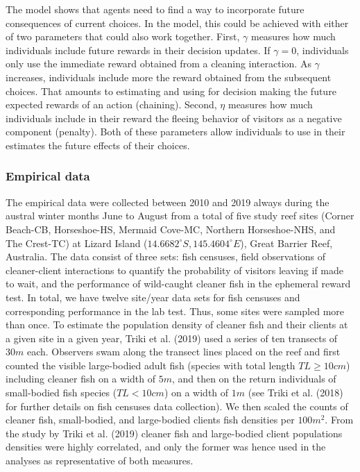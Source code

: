 \documentclass[
  12pt,
]{article}
\begin{document}
The model shows that agents need to find a way to incorporate future
consequences of current choices. In the model, this could be achieved
with either of two parameters that could also work together. First,
\(\gamma\) measures how much individuals include future rewards in their
decision updates. If \(\gamma=0\), individuals only use the immediate
reward obtained from a cleaning interaction. As \(\gamma\) increases,
individuals include more the reward obtained from the subsequent
choices. That amounts to estimating and using for decision making the
future expected rewards of an action (chaining). Second, \(\eta\)
measures how much individuals include in their reward the fleeing
behavior of visitors as a negative component (penalty). Both of these
parameters allow individuals to use in their estimates the future
effects of their choices.

\hypertarget{empirical-data}{%
\subsubsection{Empirical data}\label{empirical-data}}

The empirical data were collected between 2010 and 2019 always during
the austral winter months June to August from a total of five study reef
sites (Corner Beach-CB, Horseshoe-HS, Mermaid Cove-MC, Northern
Horseshoe-NHS, and The Crest-TC) at Lizard Island
(\(14.6682^\circ S, 145.4604^\circ E\)), Great Barrier Reef, Australia.
The data consist of three sets: fish censuses, field observations of
cleaner-client interactions to quantify the probability of visitors
leaving if made to wait, and the performance of wild-caught cleaner fish
in the ephemeral reward test. In total, we have twelve site/year data
sets for fish censuses and corresponding performance in the lab test.
Thus, some sites were sampled more than once. To estimate the population
density of cleaner fish and their clients at a given site in a given
year, Triki et al. (2019) used a series of ten transects of \(30m\)
each. Observers swam along the transect lines placed on the reef and
first counted the visible large-bodied adult fish (species with total
length \(TL \geq 10cm\)) including cleaner fish on a width of \(5m\),
and then on the return individuals of small-bodied fish species
(\(TL < 10 cm\)) on a width of \(1 m\) (see Triki et al. (2018) for
further details on fish censuses data collection). We then scaled the
counts of cleaner fish, small-bodied, and large-bodied clients fish
densities per \(100 m^2\). From the study by Triki et al. (2019) cleaner
fish and large-bodied client populations densities were highly
correlated, and only the former was hence used in the analyses as
representative of both measures.
\end{document}
